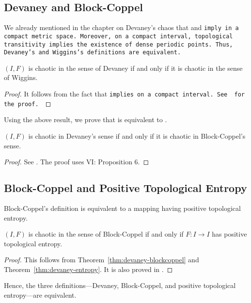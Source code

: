 \documentclass[12pt,twoside,draft]{book}
\begin{document}
\subsection*{Devaney and Block-Coppel}
We already mentioned in the chapter on Devaney's chaos that \dpp and \tt imply \sdic in a compact metric space.
Moreover, on a compact interval, topological transitivity implies the existence of dense periodic points.
Thus, Devaney's and Wiggins's definitions are equivalent.
\begin{theorem}
  $(I,F)$ is chaotic in the sense of Devaney if and only if it is chaotic in the sense of Wiggins.
  \label{thm:devaney-wiggins}
  \begin{proof}
    It follows from the fact that \tt implies \dpp on a compact interval.
    See \citet{silverman} for the proof.
  \end{proof}
\end{theorem}
Using the above result, we prove that \dev is equivalent to \blcp. 
\begin{theorem}
  \citep{aulbach}
  $(I,F)$ is chaotic in Devaney's sense if and only if it is chaotic in Block-Coppel's sense.
  \begin{proof}
    See \citep{aulbach}.
    The proof uses \citep{blockcoppel} VI: Proposition 6.
  \end{proof}
  \label{thm:devaney-blockcoppel}
\end{theorem}

\subsection*{Block-Coppel and Positive Topological Entropy}
Block-Coppel's definition is equivalent to a mapping having positive topological entropy.
\begin{theorem}
  $(I,F)$ is chaotic in the sense of Block-Coppel if and only if $F: I \to I$ has positive topological entropy.
  \label{thm:entropy-blockcoppel}
  \begin{proof}
    This follows from Theorem~\ref{thm:devaney-blockcoppel} and Theorem~\ref{thm:devaney-entropy}.
    It is also proved in \citet[VII, Theorem 24]{blockcoppel}.
  \end{proof}
\end{theorem}
Hence, the three definitions---Devaney, Block-Coppel, and positive topological entropy---are equivalent.
\end{document}

